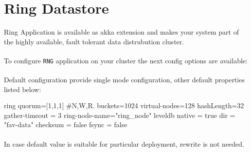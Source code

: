 \section*{Ring Datastore}
\paragraph{}
Ring Application is available as akka extension and makes your system part of the highly available, fault tolerant data distrubution cluster.

\paragraph{}
To configure \texttt{RNG} application on your cluster the next config options are available:

\paragraph{}
Default configuration provide single mode configuration, other default properties listed below:

\begin{json}
ring{
  quorum=[1,1,1]  #N,W,R.
  buckets=1024
  virtual-nodes=128
  hashLength=32
  gather-timeout = 3
  ring-node-name="ring_node"
  leveldb {
    native = true
    dir = "fav-data"
    checksum = false
    fsync = false
  }
}
\end{json}

\paragraph{}
In case default value is suitable for particular deployment, rewrite is not needed.

